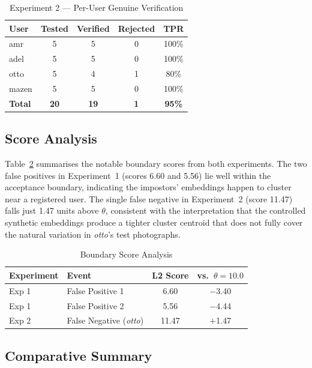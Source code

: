 \documentclass[conference]{IEEEtran}
\begin{document}
\begin{table}[H]
\centering
\caption{Experiment 2 — Per-User Genuine Verification}
\label{tab:exp2_user}
\renewcommand{\arraystretch}{1.2}
\begin{tabular}{lcccc}
\toprule
User & Tested & Verified & Rejected & TPR \\
\midrule
amr   & 5 & 5 & 0 & 100\% \\
adel  & 5 & 5 & 0 & 100\% \\
otto  & 5 & 4 & 1 & 80\%  \\
mazen & 5 & 5 & 0 & 100\% \\
\midrule
\textbf{Total} & \textbf{20} & \textbf{19} & \textbf{1} & \textbf{95\%} \\
\bottomrule
\end{tabular}
\end{table}

\subsection{Score Analysis}

Table~\ref{tab:scores} summarises the notable boundary scores from both experiments. The two false positives in Experiment~1 (scores 6.60 and 5.56) lie well within the acceptance boundary, indicating the impostors' embeddings happen to cluster near a registered user. The single false negative in Experiment~2 (score 11.47) falls just 1.47 units above $\theta$, consistent with the interpretation that the controlled synthetic embeddings produce a tighter cluster centroid that does not fully cover the natural variation in \textit{otto}'s test photographs.

\begin{table}[H]
\centering
\caption{Boundary Score Analysis}
\label{tab:scores}
\renewcommand{\arraystretch}{1.2}
\begin{tabular}{llcc}
\toprule
Experiment & Event & L2 Score & vs.\ $\theta\!=\!10.0$ \\
\midrule
Exp 1 & False Positive 1 & 6.60 & $-$3.40 \\
Exp 1 & False Positive 2 & 5.56 & $-$4.44 \\
Exp 2 & False Negative (\textit{otto}) & 11.47 & $+$1.47 \\
\bottomrule
\end{tabular}
\end{table}

\subsection{Comparative Summary}
\end{document}
